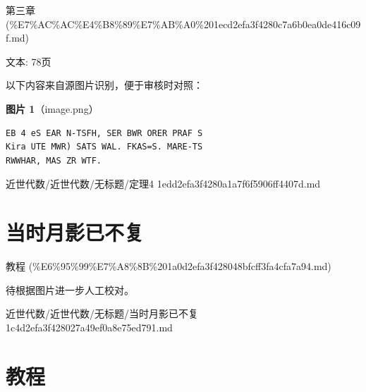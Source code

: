 \begin{note}[来源上级主题]

第三章 (\%E7\%AC\%AC\%E4\%B8\%89\%E7\%AB\%A0\%201ecd2efa3f4280c7a6b0ea0de416c09f.md)

\end{note}

\begin{theorem}[定理4]

文本: 78页

\end{theorem}

\begin{note}
以下内容来自源图片识别，便于审核时对照：

\textbf{图片 1}（image.png）
\begin{Verbatim}[fontsize=\small]
EB 4 eS EAR N-TSFH, SER BWR ORER PRAF S
Kira UTE MWR) SATS WAL. FKAS=S. MARE-TS
RWWHAR, MAS ZR WTF.
\end{Verbatim}

\end{note}

\begin{note}[来源路径]

近世代数/近世代数/无标题/定理4 1edd2efa3f4280a1a7f6f5906ff4407d.md

\end{note}

\section*{当时月影已不复}

\begin{note}[来源上级主题]

教程 (\%E6\%95\%99\%E7\%A8\%8B\%201a0d2efa3f428048bfcff3fa4cfa7a94.md)

\end{note}

\begin{note}[当时月影已不复]

待根据图片进一步人工校对。

\end{note}

\begin{note}[来源路径]

近世代数/近世代数/无标题/当时月影已不复 1c4d2efa3f428027a49ef0a8e75ed791.md

\end{note}

\section*{教程}

